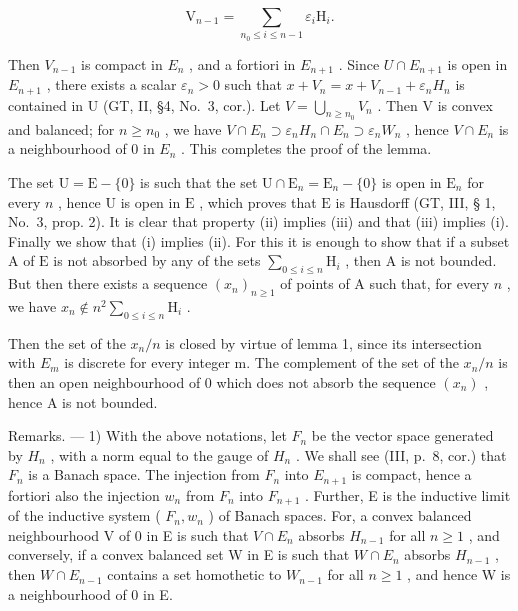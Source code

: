 \[
\mathrm{V} _ {n - 1} = \sum_ {n _ {0} \leqslant i \leqslant n - 1} \varepsilon_ {i} \mathrm{H} _ {i}.
\]

Then \(V_{n-1}\) is compact in \(E_{n}\) , and a fortiori in \(E_{n+1}\) . Since \(U \cap E_{n+1}\) is open in \(E_{n+1}\) , there exists a scalar \(\varepsilon_{n} > 0\) such that \(x + V_{n} = x + V_{n-1} + \varepsilon_{n}H_{n}\) is contained in U (GT, II, §4, No.~3, cor.). Let \(V = \bigcup_{n \geqslant n_{0}} V_{n}\) . Then V is convex and balanced; for \(n \geqslant n_{0}\) , we have \(V \cap E_{n} \supset \varepsilon_{n}H_{n} \cap E_{n} \supset \varepsilon_{n}W_{n}\) , hence \(V \cap E_{n}\) is a neighbourhood of 0 in \(E_{n}\) . This completes the proof of the lemma.

The set \(\mathrm{U} = \mathrm{E} - \{0\}\) is such that the set \(\mathrm{U} \cap \mathrm{E}_n = \mathrm{E}_n - \{0\}\) is open in \(\mathrm{E}_n\) for every \(n\) , hence \(\mathrm{U}\) is open in \(\mathrm{E}\) , which proves that \(\mathrm{E}\) is Hausdorff (GT, III, § 1, No.~3, prop. 2). It is clear that property (ii) implies (iii) and that (iii) implies (i). Finally we show that (i) implies (ii). For this it is enough to show that if a subset \(\mathrm{A}\) of \(\mathrm{E}\) is not absorbed by any of the sets \(\sum_{0 \leqslant i \leqslant n} \mathrm{H}_i\) , then \(\mathrm{A}\) is not bounded. But then there exists a sequence \((x_n)_{n \geqslant 1}\) of points of \(\mathrm{A}\) such that, for every \(n\) , we have \(x_n \notin n^2 \sum_{0 \leqslant i \leqslant n} \mathrm{H}_i\) .

Then the set of the \(x_{n}/n\) is closed by virtue of lemma 1, since its intersection with \(E_{m}\) is discrete for every integer m. The complement of the set of the \(x_{n}/n\) is then an open neighbourhood of 0 which does not absorb the sequence \((x_{n})\) , hence A is not bounded.

Remarks. --- 1) With the above notations, let \(F_{n}\) be the vector space generated by \(H_{n}\) , with a norm equal to the gauge of \(H_{n}\) . We shall see (III, p.~8, cor.) that \(F_{n}\) is a Banach space. The injection from \(F_{n}\) into \(E_{n+1}\) is compact, hence a fortiori also the injection \(w_{n}\) from \(F_{n}\) into \(F_{n+1}\) . Further, E is the inductive limit of the inductive system ( \(F_{n}, w_{n}\) ) of Banach spaces. For, a convex balanced neighbourhood V of 0 in E is such that \(V \cap E_{n}\) absorbs \(H_{n-1}\) for all \(n \geqslant 1\) , and conversely, if a convex balanced set W in E is such that \(W \cap E_{n}\) absorbs \(H_{n-1}\) , then \(W \cap E_{n-1}\) contains a set homothetic to \(W_{n-1}\) for all \(n \geqslant 1\) , and hence W is a neighbourhood of 0 in E.

